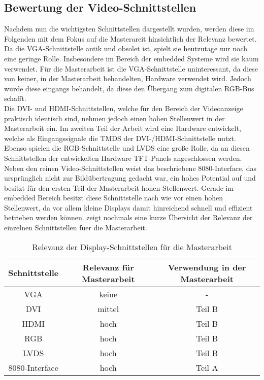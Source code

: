 \subsection{Bewertung der Video-Schnittstellen}
Nachdem nun die wichtigsten Schnittstellen dargestellt wurden, werden diese im Folgenden mit dem Fokus auf die Masterareit hinsichtlich der Relevanz bewertet.
Da die VGA-Schnittstelle antik und obsolet ist, spielt sie heutzutage nur noch eine geringe Rolle. Insbesondere im Bereich der embedded Systeme wird sie kaum verwendet. Für die Masterarbeit ist die VGA-Schnittstelle uninteressant, da diese von keiner, in der Masterarbeit behandelten, Hardware verwendet wird. Jedoch wurde diese eingangs behandelt, da diese den Übergang zum digitalen RGB-Bus schafft.\\
Die DVI- und HDMI-Schnittstellen, welche für den Bereich der Videoanzeige praktisch identisch sind, nehmen jedoch einen hohen Stellenwert in der Masterarbeit ein. Im zweiten Teil der Arbeit wird eine Hardware entwickelt, welche als Eingangssignale die TMDS der DVI-/HDMI-Schnittstelle nutzt. 
Ebenso spielen die RGB-Schnittstelle und LVDS eine große Rolle, da an diesen Schnittstellen der entwickelten Hardware TFT-Panels angeschlossen werden. \\
Neben den reinen Video-Schnittstellen weist das beschriebene 8080-Interface, das ursprünglich nicht zur Bildübertragung gedacht war, ein hohes Potential auf und besitzt für den ersten Teil der Masterarbeit hohen Stellenwert. Gerade im embedded Bereich besitzt diese Schnittstelle nach wie vor einen hohen Stellenwert, da vor allem kleine Displays damit hinreichend schnell und effizient betrieben werden können.  zeigt nochmals eine kurze Übersicht der Relevanz der einzelnen Schnittstellen fuer die Masterarbeit.

\begin{table}
\begin{tabular}{|c|c|c|}\hline
   Schnittstelle & Relevanz für Masterarbeit & Verwendung in der Masterarbeit\\ \hline
   VGA & keine  & - \\               \hline
   DVI & mittel & Teil B \\          \hline
   HDMI & hoch	& Teil B \\          \hline
   RGB & hoch & Teil B \\            \hline
   LVDS & hoch & Teil B \\           \hline
   8080-Interface & hoch & Teil A \\ \hline
\end{tabular}
\caption{Relevanz der Display-Schnittstellen für die Masterarbeit}
\label{tab:interface_vergleich}
\end{table}

